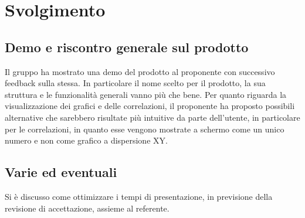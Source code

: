 \newpage
\section*{Svolgimento}

	\subsection*{Demo e riscontro generale sul prodotto}
		Il gruppo ha mostrato una demo del prodotto al proponente con successivo feedback sulla stessa. In particolare il nome scelto per il prodotto, la sua struttura e le funzionalità generali vanno più che bene.
		\newline
		Per quanto riguarda la visualizzazione dei grafici e delle correlazioni, il proponente ha proposto possibili alternative che sarebbero risultate più intuitive da parte dell'utente, in particolare per le correlazioni, in quanto esse vengono mostrate a schermo come un unico numero e non come grafico a dispersione XY.

	\subsection*{Varie ed eventuali}
		Si è discusso come ottimizzare i tempi di presentazione, in previsione della revisione di accettazione, assieme al referente.
